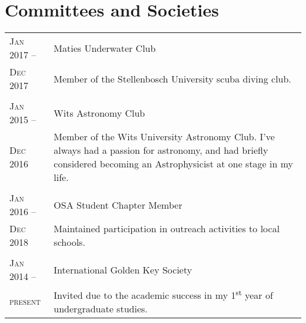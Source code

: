 \section{Committees and Societies}

\begin{supertabular}{p{1.8cm}|p{12cm}}
	\textsc{Jan 2017 --} & Maties Underwater Club \\
	\textsc{Dec 2017} & \small{Member of the Stellenbosch University scuba diving club.} \\
	 \\
	\textsc{Jan 2015 --} & Wits Astronomy Club \\
	\textsc{Dec 2016} & \small{Member of the Wits University Astronomy Club. I've always had a passion for astronomy, and had briefly considered becoming an Astrophysicist at one stage in my life.} \\
	 \\
	\textsc{Jan 2016 --} & OSA Student Chapter Member \\
	\textsc{Dec 2018} & \small{Maintained participation in outreach activities to local schools.} \\
	 \\
	\textsc{Jan 2014 --} & International Golden Key Society \\
	\textsc{present} & \small{Invited due to the academic success in my 1\textsuperscript{st} year of undergraduate studies.} \\ 
\end{supertabular}